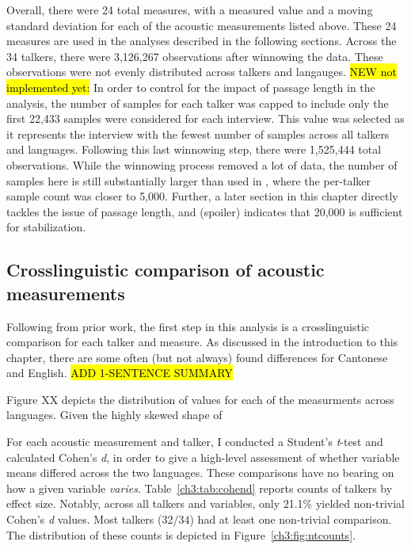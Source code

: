 Overall, there were 24 total measures, with a measured value and a moving standard deviation for each of the acoustic measurements listed above. These 24 measures are used in the analyses described in the following sections. Across the 34 talkers, there were 3,126,267 observations after winnowing the data. These observations were not evenly distributed across talkers and langauges. \hl{NEW not implemented yet:} In order to control for the impact of passage length in the analysis, the number of samples for each talker was capped to include only the first 22,433 samples were considered for each interview. This value was selected as it represents the interview with the fewest number of samples across all talkers and languages. Following this last winnowing step, there were 1,525,444 total observations. While the winnowing process removed a lot of data, the number of samples here is still substantially larger than used in \citet{lee_2019_acoustic}, where the per-talker sample count was closer to 5,000. Further, a later section in this chapter directly tackles the issue of passage length, and (spoiler) indicates that 20,000 is sufficient for stabilization.

\subsection{Crosslinguistic comparison of acoustic measurements} %

Following from prior work, the first step in this analysis is a crosslinguistic comparison for each talker and measure. As discussed in the introduction to this chapter, there are some often (but not always) found differences for Cantonese and English. \hl{ADD 1-SENTENCE SUMMARY}

Figure XX depicts the distribution of values for each of the measurments across languages. Given the highly skewed shape of 


For each acoustic measurement and talker, I conducted a Student's \textit{t}-test and calculated Cohen's \textit{d}, in order to give a high-level assessment of whether variable means differed across the two languages. These comparisons have no bearing on how a given variable \textit{varies}. Table~\ref{ch3:tab:cohend} reports counts of talkers by effect size. Notably, across all talkers and variables, only 21.1\% yielded non-trivial Cohen's \textit{d} values. Most talkers (32/34) had at least one non-trivial comparison. The distribution of these counts is depicted in Figure~\ref{ch3:fig:ntcounts}. 

